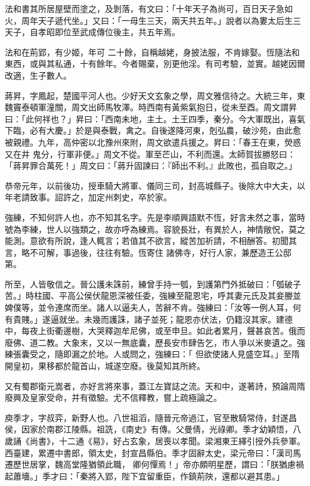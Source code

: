 \begin{pinyinscope}
 法和書其所居屋壁而塗之，及剝落，有文曰：「十年天子為尚可，百日天子急如火，周年天子遞代坐。」又曰：「一母生三天，兩天共五年。」說者以為婁太后生三天子，自孝昭即位至武成傳位後主，共五年焉。



 法和在荊郢，有少姬，年可
 二十餘，自稱越姥，身披法服，不肯嫁娶。恆隨法和東西，或與其私通，十有餘年。今者賜棄，別更他淫。有司考驗，並實。越姥因爾改適，生子數人。



 蔣昇，字鳳起，楚國平河人也。少好天文玄象之學，周文雅信待之。大統三年，東魏竇泰頓軍潼關，周文出師馬牧澤。時西南有黃紫氣抱日，從未至酉。周文謂昇曰：「此何祥也？」昇曰：「西南未地，主土。土王四季，秦分。今大軍既出，喜氣下臨，必有大慶。」於是與泰戰，禽之。自後遂降河東，剋弘農，破沙苑，由此愈被親禮。九年，高仲密以北豫州來附，周文欲遣兵援之。昇曰：「春王在東，熒惑又在井
 鬼分，行軍非便。」周文不從。軍至芒山，不利而還。太師賀拔勝怒曰：「蔣昇罪合萬死！」周文曰：「蔣升固諫曰：『師出不利。』此敗也，孤自取之。」



 恭帝元年，以前後功，授車騎大將軍、儀同三司，封高城縣子。後除大中大夫，以年老請致事。詔許之，加定州刺史，卒於家。



 強練，不知何許人也，亦不知其名字。先是李順興語默不恆，好言未然之事，當時號為李練，世人以強類之，故亦呼為練焉。容貌長壯，有異於人，神情敞怳，莫之能測。意欲有所說，逢人輒言；若值其不欲言，縱苦加祈請，不相酬答。初聞其言，略不可解，事過後，往往有驗。恆寄住
 諸佛寺，好行人家，兼歷造王公邸第。



 所至，人皆敬信之。晉公護未誅前，練曾手持一瓠，到護第門外抵破曰：「瓠破子苦。」時柱國、平高公侯伏龍恩深被任委，強練至龍恩宅，呼其妻元氏及其妾媵並婢僕等，並令連席而坐。諸人以逼夫人，苦辭不肯。強練曰：「汝等一例人耳，何有貴賤。」遂逼就坐。未幾而護誅，諸子並死；龍恩亦伏法，仍籍沒其家。建德中，每夜上街衢邊樹，大哭釋迦牟尼佛，或至申旦。如此者累月，聲甚哀苦。俄而廢佛、道二教。大象末，又以一無底囊，歷長安市肆告乞，市人爭以米麥遺之。強練張囊受之，隨即漏之於地。人或問之，強練曰：「
 但欲使諸人見盛空耳。」至隋開皇初，果移都於龍首山，城遂空廢。後莫知其所終。



 又有蜀郡衛元嵩者，亦好言將來事，蓋江左寶誌之流。天和中，遂著詩，預論周隋廢興及皇家受命，并有徵驗。尤不信釋教，嘗上疏極論之。



 庾季才，字叔弈，新野人也。八世祖滔，隨晉元帝過江，官至散騎常侍，封遂昌侯，因家於南郡江陵縣。祖詵，《南史》有傳。父曼倩，光祿卿。季才幼穎悟，八歲誦《尚書》，十二通《易》，好占玄象，居喪以孝聞。梁湘東王繹引授外兵參軍。西臺建，累遷中書郎，領太史，封宣昌縣伯。季才固辭太史，梁元帝曰：「漢司馬遷歷世居掌，魏高堂隆猶領此職，
 卿何憚焉！」帝亦頗明星歷，謂曰：「朕猶慮禍起蕭墻。」季才曰：「秦將入郢，陛下宜留重臣，作鎮荊陜，還都以避其患。」




\end{pinyinscope}
